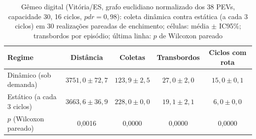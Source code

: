 \begin{table}[H]
\centering\singlespacing
\begin{minipage}{\textwidth}
\caption{Gêmeo digital (Vitória/ES, grafo euclidiano normalizado dos 38 PEVs, capacidade 30, 16 ciclos, $\mathit{pdr}=0{,}98$): coleta dinâmica contra estática (a cada 3 ciclos) em 30 realizações pareadas de enchimento; células: média $\pm$ IC95\%; transbordos por episódio; última linha: $p$ de Wilcoxon pareado}
\label{tab:twin}
\centering
\begin{tabular}{lcccc}
\toprule
\textbf{Regime} & \textbf{Distância} & \textbf{Coletas} & \textbf{Transbordos} & \textbf{Ciclos com rota} \\
\midrule
Dinâmico (sob demanda) & $3751{,}0 \pm 72{,}7$ & $123{,}9 \pm 2{,}5$ & $27{,}0 \pm 2{,}0$ & $15{,}0 \pm 0{,}1$ \\
Estático (a cada 3 ciclos) & $3663{,}6 \pm 36{,}9$ & $228{,}0 \pm 0{,}0$ & $19{,}1 \pm 2{,}1$ & $6{,}0 \pm 0{,}0$ \\
\midrule
$p$ (Wilcoxon pareado) & 0{,}0016 & 0{,}0000 & 0{,}0000 & 0{,}0000 \\
\bottomrule
\end{tabular}
\end{minipage}
\end{table}
